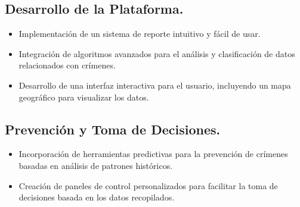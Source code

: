 \documentclass{article}
\begin{document}
    \subsection{Desarrollo de la Plataforma.}
        \begin{itemize}
            \item Implementación de un sistema de reporte intuitivo y fácil de usar.
            \item Integración de algoritmos avanzados para el análisis y clasificación de datos relacionados con crímenes.
            \item Desarrollo de una interfaz interactiva para el usuario, incluyendo un mapa geográfico para visualizar los datos.
        \end{itemize}

    \subsection{Prevención y Toma de Decisiones.}
        \begin{itemize}
            \item Incorporación de herramientas predictivas para la prevención de crímenes basadas en análisis de patrones históricos.
            \item Creación de paneles de control personalizados para facilitar la toma de decisiones basada en los datos recopilados.
        \end{itemize}
\end{document}
